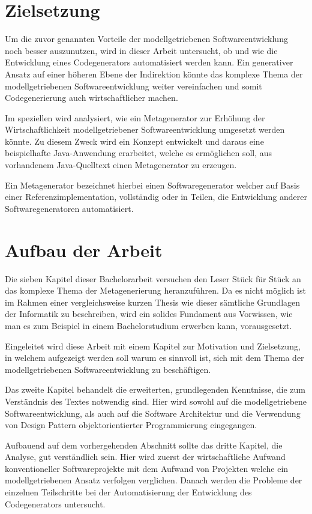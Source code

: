 \documentclass[12pt,oneside,a4paper,parskip]{scrbook}
\begin{document}
\section{Zielsetzung}

Um die zuvor genannten Vorteile der modellgetriebenen Softwareentwicklung noch besser auszunutzen, wird in dieser Arbeit untersucht, ob und wie die Entwicklung eines Codegenerators automatisiert werden kann. Ein generativer Ansatz auf einer höheren Ebene der Indirektion könnte das komplexe Thema der modellgetriebenen Softwareentwicklung weiter vereinfachen und somit Codegenerierung auch wirtschaftlicher machen.

Im speziellen wird analysiert, wie ein Metagenerator zur Erhöhung der Wirtschaftlichkeit modellgetriebener Softwareentwicklung umgesetzt werden könnte. Zu diesem Zweck wird ein Konzept entwickelt und daraus eine beispielhafte Java-Anwendung erarbeitet, welche es ermöglichen soll, aus vorhandenem Java-Quelltext einen Metagenerator zu erzeugen.

Ein Metagenerator bezeichnet hierbei einen Softwaregenerator welcher auf Basis einer Referenzimplementation, vollständig oder in Teilen, die Entwicklung anderer Softwaregeneratoren automatisiert.

\section{Aufbau der Arbeit}

Die sieben Kapitel dieser Bachelorarbeit versuchen den Leser Stück für Stück an das komplexe Thema der Metagenerierung heranzuführen. Da es nicht möglich ist im Rahmen einer vergleichsweise kurzen Thesis wie dieser sämtliche Grundlagen der Informatik zu beschreiben, wird ein solides Fundament aus Vorwissen, wie man es zum Beispiel in einem Bachelorstudium erwerben kann, vorausgesetzt.

Eingeleitet wird diese Arbeit mit einem Kapitel zur Motivation und Zielsetzung, in welchem aufgezeigt werden soll warum es sinnvoll ist, sich mit dem Thema der modellgetriebenen Softwareentwicklung zu beschäftigen. 

Das zweite Kapitel behandelt die erweiterten, grundlegenden Kenntnisse, die zum Verständnis des Textes notwendig sind. Hier wird sowohl auf die modellgetriebene Softwareentwicklung, als auch auf die Software Architektur und die Verwendung von Design Pattern objektorientierter Programmierung eingegangen.

Aufbauend auf dem vorhergehenden Abschnitt sollte das dritte Kapitel, die Analyse, gut verständlich sein. Hier wird zuerst der wirtschaftliche Aufwand konventioneller Softwareprojekte mit dem Aufwand von Projekten welche ein modellgetriebenen Ansatz verfolgen verglichen. Danach werden die Probleme der einzelnen Teilschritte bei der Automatisierung der Entwicklung des Codegenerators untersucht.
\end{document}
